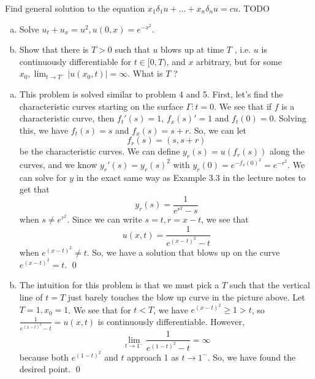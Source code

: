 \documentclass{article}
\renewcommand{\d}{\delta}
\begin{document}
\newpage
{} Find general solution to the equation $x_1\d_1u + ... + x_n\d_nu = cu$. \tri
\hop
\solution TODO


\newpage
{} 
\begin{enumerate}[(a)]
    \item Solve $u_t + u_x = u^2, u(0, x) = e^{-x^2}$.
    \item Show that there is $T > 0$ such that $u$ blows up at time $T$ , i.e. $u$ is continuously differentiable
    for $t \in [0, T )$, and $x$ arbitrary, but for some $x_0, \lim_{t\to T^-}|u(x_0, t)|= \infty$. What is $T$ ?
\end{enumerate}
\tri
\hop
\solution
\begin{enumerate}[(a)]
    \item This problem is solved similar to problem 4 and 5. First, let's find the characteristic curves starting on the surface $\Gamma: t = 0$. We see that if $f$ is a characteristic curve, then $f_t'(s) = 1$, $f_x(s)' =1$ and $f_t(0)= 0$.
    \hop
    Solving this, we have $f_t(s) = s$ and $f_x(s) = s+r$. So, we can let
    \[f_r(s)=(s, s+r)\]
    be the characteristic curves. We can define $y_r(s) = u(f_r(s))$ along the curves, and we know $y_r'(s) = y_r(s)^2$ with $y_r(0) = e^{-f_x(0)^2} = e^{-r^2}$. 
    \hop
    We can solve for $y$ in the exact same way as Example 3.3 in the lecture notes to get that 
    \[y_r(s) = \frac{1}{e^{r^2}-s}\]
    when $s \ne e^{r^2}$. Since we can write $s = t, r = x-t$, we see that 
    \[u(x,t) = \frac{1}{e^{(x-t)^2}-t}\]
    when $e^{(x-t)^2} \ne t$. So, we have a solution that blows up on the curve $e^{(x-t)^2} = t$. \qed

    \item The intuition for this problem is that we must pick a $T$ such that the vertical line of $t = T$ just barely touches the blow up curve in the picture above.
    \hop
    Let $T=1, x_0 = 1$. We see that for $t < T$, we have $e^{(x-t)^2} \ge 1 > t$,  so $\frac{1}{e^{(x-t)^2}-t} = u(x,t)$ is continuously differentiable. However, 
    \[\lim_{t \to 1^-}\frac{1}{e^{(1-t)^2}-t} = \infty\]
    because both $e^{(1-t)^2}$ and $t$ approach 1 as $t \to 1^-$. So, we have found the desired point. \qed
\end{enumerate}
\end{document}
